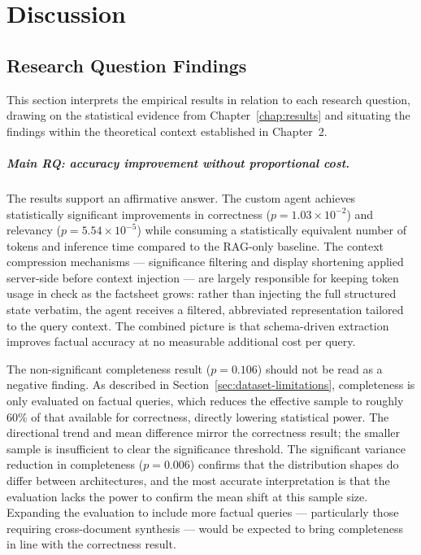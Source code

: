 \chapter{Discussion}
\label{chap:discussion}

\section{Research Question Findings}

This section interprets the empirical results in relation to each research question,
drawing on the statistical evidence from Chapter~\ref{chap:results} and situating the
findings within the theoretical context established in Chapter~2.

\paragraph{Main RQ: accuracy improvement without proportional cost.}
The results support an affirmative answer. The custom agent achieves statistically
significant improvements in correctness ($p = 1.03 \times 10^{-2}$) and relevancy
($p = 5.54 \times 10^{-5}$) while consuming a statistically equivalent number of
tokens and inference time compared to the RAG-only baseline. The context compression
mechanisms --- significance filtering and display shortening applied server-side before
context injection --- are largely responsible for keeping token usage in check as the
factsheet grows: rather than injecting the full structured state verbatim, the agent
receives a filtered, abbreviated representation tailored to the query context. The
combined picture is that schema-driven extraction improves factual accuracy at no
measurable additional cost per query.

The non-significant completeness result ($p = 0.106$) should not be read as a negative
finding. As described in Section~\ref{sec:dataset-limitations}, completeness is only
evaluated on factual queries, which reduces the effective sample to roughly 60\% of
that available for correctness, directly lowering statistical power. The directional
trend and mean difference mirror the correctness result; the smaller sample is
insufficient to clear the significance threshold. The significant variance reduction
in completeness ($p = 0.006$) confirms that the distribution shapes do differ between
architectures, and the most accurate interpretation is that the evaluation lacks the
power to confirm the mean shift at this sample size. Expanding the evaluation to include
more factual queries --- particularly those requiring cross-document synthesis ---
would be expected to bring completeness in line with the correctness result.


